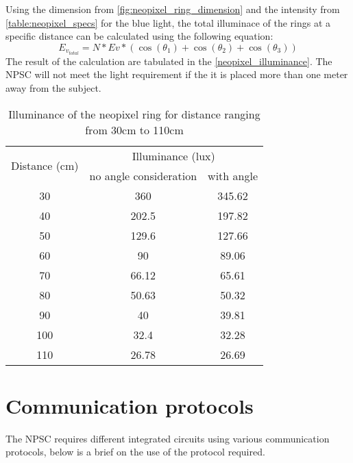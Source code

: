 Using the dimension from \cref{fig:neopixel_ring_dimension} and the intensity from \cref{table:neopixel_specs} for the blue light, the total illuminace of the rings at a specific distance can be calculated using the following equation:
\begin{equation}\label{eq:total_illuminance}
E_{v_{total}} = N*Ev*(\cos(\theta_1)+\cos(\theta_2)+\cos(\theta_3))
\end{equation}
The result of the calculation are tabulated in the \cref{neopixel_illuminance}. The NPSC will not meet the light requirement if the it is placed more than one meter away from the subject.
\begin{table}[h!]
\centering
\begin{tabular}{ccc}
\hline
\hline
\multirow{2}{*}{Distance (cm)}  & \multicolumn{2}{c}{Illuminance (lux)} \\  
 & no angle consideration & with angle \\
\hline
30 & 360 & 345.62\\
40 & 202.5 & 197.82\\
50 & 129.6 & 127.66\\
60 & 90 & 89.06\\
70 & 66.12 & 65.61\\
80 & 50.63 & 50.32\\
90 & 40 & 39.81\\
100 & 32.4 & 32.28\\
110 & 26.78 & 26.69\\
\hline
\hline
\end{tabular}
\caption{Illuminance of the neopixel ring for distance ranging from 30cm to 110cm}
\label{table:neopixel_illuminance}
\end{table}
\section{Communication protocols}
The NPSC requires different integrated circuits using various communication protocols, below is a brief on the use of the protocol required.

